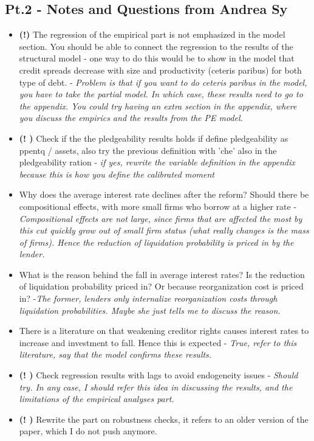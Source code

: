 \documentclass[12pt]{article}
\begin{document}
\subsection*{Pt.2 - Notes and Questions from Andrea Sy}
\begin{itemize} \setlength\itemsep{0em}  \small
    \item \textbf{(!)} The regression of the empirical part is not emphasized in the model section. You should be able to connect the regression to the results of the structural model - one way to do this would be to show in the model that credit spreads decrease with size and productivity (ceteris paribus) for both type of debt. - \textit{Problem is that if you want to do ceteris paribus in the model, you have to take the partial model. In which case, these results need to go to the appendix. You could try having an extra section in the appendix, where you discuss the empirics and the results from the PE model.}
    \item \textbf{(! \checkmark)} Check if the the pledgeability results holds if define pledgeability as ppentq / assets, also try the previous definition with 'che' also in the pledgeability ration - \textit{if yes, rewrite the variable definition in the appendix because this is how you define the calibrated moment}
    \item Why does the average interest rate declines after the reform? Should there be compositional effects, with more small firms who borrow at a higher rate - \textit{Compositional effects are not large, since firms that are affected the most by this cut quickly grow out of small firm status (what really changes is the mass of firms). Hence the reduction of liquidation probability is priced in by the lender.} 
    \item What is the reason behind the fall in average interest rates? Is the reduction of liquidation probability priced in? Or because reorganization cost is priced in? -\textit{The former, lenders only internalize reorganization costs through liquidation probabilities. Maybe she just tells me to discuss the reason.}
    \item There is a literature on that weakening creditor rights causes interest rates to increase and investment to fall. Hence this is expected - \textit{True, refer to this literature, say that the model confirms these results.}
    \item \textbf{(! \checkmark)} Check regression results with lags to avoid endogeneity issues - \textit{Should try. In any case, I should refer this idea in discussing the results, and the limitations of the empirical analyses part.} 
    \item \textbf{(! \checkmark)} Rewrite the part on robustness checks, it refers to an older version of the paper, which I do not push anymore. 
\end{itemize} \normalsize
\end{document}
